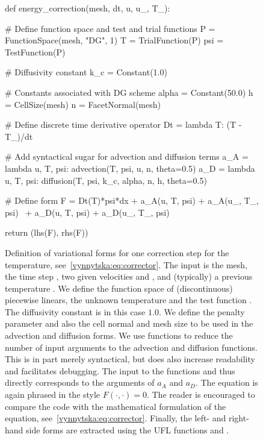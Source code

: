 \begin{figure}
  \begin{center}
    \begin{python}
def energy_correction(mesh, dt, u, u_, T_):

    # Define function space and test and trial functions
    P = FunctionSpace(mesh, "DG", 1)
    T = TrialFunction(P)
    psi = TestFunction(P)

    # Diffusivity constant
    k_c = Constant(1.0)

    # Constants associated with DG scheme
    alpha = Constant(50.0)
    h = CellSize(mesh)
    n = FacetNormal(mesh)

    # Define discrete time derivative operator
    Dt =  lambda T: (T - T_)/dt

    # Add syntactical sugar for advection and diffusion terms
    a_A = lambda u, T, psi: advection(T, psi, u, n, theta=0.5)
    a_D = lambda u, T, psi: diffusion(T, psi, k_c, alpha, n, h, theta=0.5)

    # Define form
    F = Dt(T)*psi*dx + a_A(u, T, psi) + a_A(u_, T_, psi) \
        + a_D(u, T, psi) + a_D(u_, T_, psi)

    return (lhs(F), rhs(F))
    \end{python}
    \caption{Definition of variational forms for one correction step
      for the temperature, see~\eqref{vynnytska:eq:corrector}. The
      input is the mesh, the time step \emp{dt}, two given velocities
      \emp{u} and \emp{u\_}, and (typically) a previous temperature
      \emp{T\_}. We define the function space of (discontinuous)
      piecewise linears, the unknown temperature \emp{T} and the test
      function \emp{psi}. The diffusivity constant \emp{k\_c} is in
      this case $1.0$. We define the penalty parameter \emp{alpha}
      and also the cell normal \emp{n} and mesh size \emp{h} to be
      used in the advection and diffusion forms.
%
      We use  functions to reduce the number of input
      arguments to the advection and diffusion functions. This is in
      part merely syntactical, but does also increase readability and
      facilitates debugging. The input to the functions \emp{a\_A}
      and \emp{a\_D} thus directly corresponds to the arguments of
      $a_A$ and $a_D$.
%
      The equation is again phrased in the style $F(\cdot, \cdot) =
      0$. The reader is encouraged to compare the code with the
      mathematical formulation of the equation,
      see~\eqref{vynnytska:eq:corrector}. Finally, the left- and
      right-hand side forms are extracted using the UFL
      functions  and .}
  \end{center}
  \label{vynnytska:fig:temperaturecorrection}
\end{figure}

